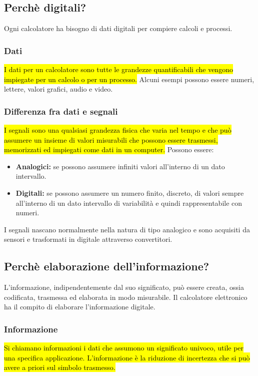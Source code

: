 \documentclass{article}
\begin{document}
\subsection{Perchè digitali?}
Ogni calcolatore ha bisogno di dati digitali per compiere calcoli e processi.

\subsubsection{Dati}
\hl{I dati per un calcolatore sono tutte le grandezze quantificabili che vengono impiegate per un calcolo o per un processo.} Alcuni esempi possono essere numeri, lettere, valori grafici, audio e video.

\subsubsection{Differenza fra dati e segnali}
\hl{I segnali sono una qualsiasi grandezza fisica che varia nel tempo e che
può assumere un insieme di valori misurabili che possono essere trasmessi, memorizzati ed impiegati come dati in un computer.} Possono essere:
\begin{itemize}
    \item \textbf{Analogici:} se possono assumere infiniti valori all’interno di un dato intervallo.
    \item \textbf{Digitali:} se possono assumere un numero finito, discreto, di valori sempre all’interno di un dato intervallo di variabilità e quindi rappresentabile con numeri.
\end{itemize}
I segnali nascano normalmente nella natura di tipo analogico e sono acquisiti da sensori e trasformati in digitale attraverso convertitori.


\subsection{Perchè elaborazione dell'informazione?}
L’informazione, indipendentemente dal suo significato, può essere creata, ossia codificata, trasmessa ed elaborata in modo misurabile.
Il calcolatore elettronico ha il compito di elaborare l’informazione digitale.

\subsubsection{Informazione}
\hl{Si chiamano informazioni i dati che assumono un significato univoco, utile per una specifica applicazione. L’informazione è la riduzione di incertezza che si può avere a priori sul simbolo trasmesso.}
\end{document}
